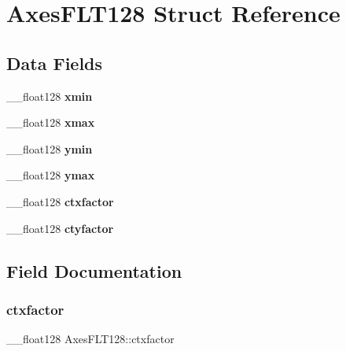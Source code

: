 \hypertarget{struct_axes_f_l_t128}{}\section{Axes\+F\+L\+T128 Struct Reference}
\label{struct_axes_f_l_t128}
\subsection*{Data Fields}
\begin{DoxyCompactItemize}
\item 
\mbox{\label{struct_axes_f_l_t128_af1e253298b60a49e5f7a1dd052275468}} 
\+\_\+\+\_\+float128 {\bfseries xmin}
\item 
\mbox{\label{struct_axes_f_l_t128_a24751b8ce05e8c5bc2c64610dd7dd642}} 
\+\_\+\+\_\+float128 {\bfseries xmax}
\item 
\mbox{\label{struct_axes_f_l_t128_a9c676c0a43582d9ea00d3018a0a4b151}} 
\+\_\+\+\_\+float128 {\bfseries ymin}
\item 
\mbox{\label{struct_axes_f_l_t128_a9b177fb1f936271e4ec1045778e9e2ea}} 
\+\_\+\+\_\+float128 {\bfseries ymax}
\item 
\mbox{\label{struct_axes_f_l_t128_acc15ccde617cb0f18df0b1e016a937a5}} 
\+\_\+\+\_\+float128 {\bfseries ctxfactor}
\item 
\mbox{\label{struct_axes_f_l_t128_a997c5dfe1f0ef1f7112aa4a866913599}} 
\+\_\+\+\_\+float128 {\bfseries ctyfactor}
\end{DoxyCompactItemize}


\subsection{Field Documentation}
\mbox{\label{struct_axes_f_l_t128_acc15ccde617cb0f18df0b1e016a937a5}} 
\subsubsection{\texorpdfstring{ctxfactor}{ctxfactor}}
{\footnotesize\ttfamily \+\_\+\+\_\+float128 Axes\+F\+L\+T128\+::ctxfactor}

